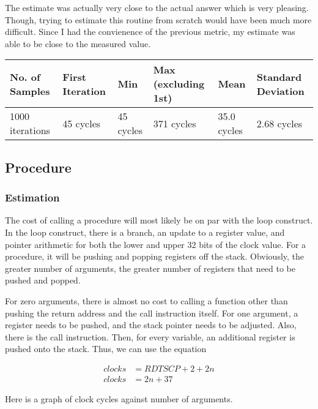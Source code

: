 \documentclass[paper=a4, fontsize=11pt]{scrartcl}
\numberwithin{equation}{section}        %
\numberwithin{figure}{section}          %
\numberwithin{table}{section}               %
\begin{document}
The estimate was actually very close to the actual answer which is very pleasing.  Though, trying to estimate this routine from scratch would have been much more difficult.  Since I had the convienence of the previous metric, my estimate was able to be close to the measured value.

\begin{center}
    \begin{tabular}{ | l | l | l | l | l | l |}
    \hline
    No. of Samples & First Iteration & Min & Max (excluding 1st) & Mean & Standard Deviation \\ \hline
    1000 iterations & 45 cycles & 45 cycles & 371 cycles & 35.0 cycles & 2.68 cycles \\ 
    \hline
    \end{tabular}
\end{center}

\subsection{Procedure}

\subsubsection{Estimation}

The cost of calling a procedure will most likely be on par with the loop construct.  In the loop construct, there is a branch, an update to a register value, and pointer arithmetic for both the lower and upper 32 bits of the clock value.  For a procedure, it will be pushing and popping registers off the stack.  Obviously, the greater number of arguments, the greater number of registers that need to be pushed and popped.

For zero arguments, there is almost no cost to calling a function other than pushing the return address and the call instruction itself.  For one argument, a register needs to be pushed, and the stack pointer needs to be adjusted.   Also, there is the call instruction. Then, for every variable, an additional register is pushed onto the stack.  Thus, we can use the equation

\begin{align}
clocks& =RDTSCP + 2 + 2n\\
clocks& =2n + 37
\end{align}

Here is a graph of clock cycles against number of arguments.

\begin{center}
\end{center}
\end{document}
